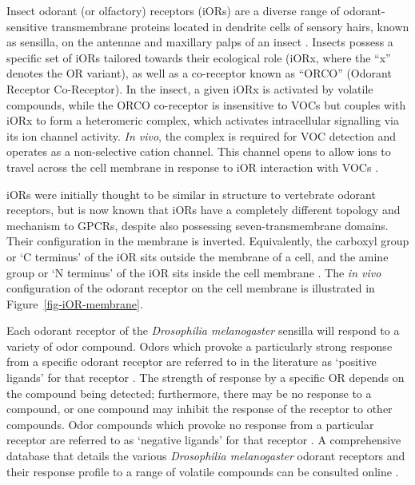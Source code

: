 \documentclass[
  a4paper,
]{scrbook}
\begin{document}
Insect odorant (or olfactory) receptors (iORs) are a diverse range of
odorant-sensitive transmembrane proteins located in dendrite cells of
sensory hairs, known as sensilla, on the antennae and maxillary palps of
an insect \autocite{Clyne1999,Wicher2021}. Insects possess a specific
set of iORs tailored towards their ecological role (iORx, where the
``x'' denotes the OR variant), as well as a co-receptor known as
``ORCO'' (Odorant Receptor Co-Receptor). In the insect, a given iORx is
activated by volatile compounds, while the ORCO co-receptor is
insensitive to VOCs but couples with iORx to form a heteromeric complex,
which activates intracellular signalling via its ion channel activity.
\emph{In vivo}, the complex is required for VOC detection and operates
as a non-selective cation channel. This channel opens to allow ions to
travel across the cell membrane in response to iOR interaction with VOCs
\autocite{Smart2008,Wicher2008,Sato2008,Carraher2015,Butterwick2018,Wicher2021,Cheema2021}.

iORs were initially thought to be similar in structure to vertebrate
odorant receptors, but is now known that iORs have a completely
different topology and mechanism to GPCRs, despite also possessing
seven-transmembrane domains. Their configuration in the membrane is
inverted. Equivalently, the carboxyl group or `C terminus' of the iOR
sits outside the membrane of a cell, and the amine group or `N terminus'
of the iOR sits inside the cell membrane
\autocite{Glatz2011,Butterwick2018,Carraher2015}. The \emph{in vivo}
configuration of the odorant receptor on the cell membrane is
illustrated in Figure~\ref{fig-iOR-membrane}.

Each odorant receptor of the \emph{Drosophilia melanogaster} sensilla
will respond to a variety of odor compound. Odors which provoke a
particularly strong response from a specific odorant receptor are
referred to in the literature as `positive ligands' for that receptor
\autocite{Murugathas2019a,Murugathas2020}. The strength of response by a
specific OR depends on the compound being detected; furthermore, there
may be no response to a compound, or one compound may inhibit the
response of the receptor to other compounds. Odor compounds which
provoke no response from a particular receptor are referred to as
`negative ligands' for that receptor
\autocite{Murugathas2019a,Murugathas2020}. A comprehensive database that
details the various \emph{Drosophilia melanogaster} odorant receptors
and their response profile to a range of volatile compounds can be
consulted online \autocite{Munch2016}.
\end{document}
